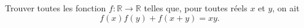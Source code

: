 \documentclass[varwidth]{standalone}
\begin{document}
    Trouver toutes les fonction $f: \mathbb{R} \to \mathbb{R}$ telles que, pour toutes r\'eels $x$ et $y$, on ait
    \[
        f(x) f(y) + f(x + y) = xy.  
    \]
\end{document}

